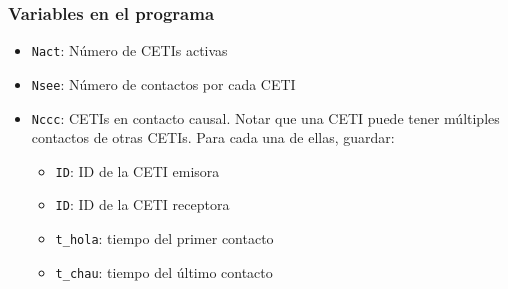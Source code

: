 \documentclass[handout]{beamer}
\theoremstyle{plain}
\theoremstyle{definition}
\theoremstyle{remark}
\begin{document}
\begin{frame}\frametitle{Variables en el programa}

   \begin{itemize}
      \item \texttt{Nact}: Número de CETIs activas
      \item \texttt{Nsee}: Número de contactos por cada CETI
      \item \texttt{Nccc}: CETIs en contacto causal.  Notar que una
         CETI puede tener múltiples contactos de otras CETIs.  Para
         cada una de ellas, guardar:
      \begin{itemize}
         \item \texttt{ID}: ID de la CETI emisora
         \item \texttt{ID}: ID de la CETI receptora
         \item \texttt{t\_hola}: tiempo del primer contacto
         \item \texttt{t\_chau}: tiempo del \'ultimo contacto
      \end{itemize}
   \end{itemize}

\end{frame}  %
% 
%
%
% 
% 
%
%
%
\end{document}
